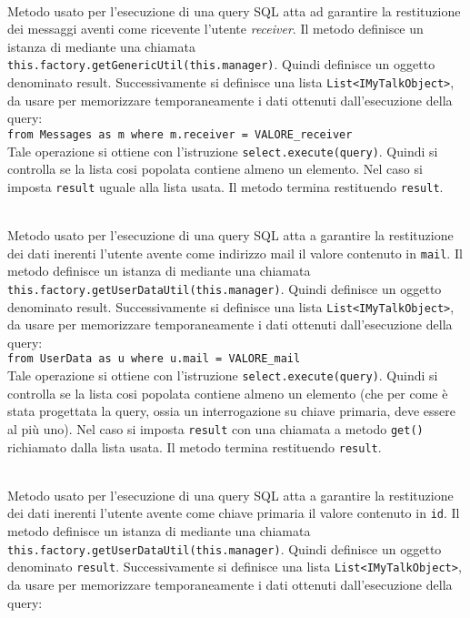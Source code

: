 \begin{description}
		\item{}\\
	Metodo usato per l'esecuzione di una query SQL atta ad garantire la restituzione dei messaggi aventi come ricevente l'utente \textit{receiver}. Il metodo definisce un istanza di  mediante una chiamata \verb|this.factory.getGenericUtil(this.manager)|. Quindi definisce un oggetto  denominato result. Successivamente si definisce una lista \texttt{List<IMyTalkObject>}, da usare per memorizzare temporaneamente i dati ottenuti dall'esecuzione della query:\\
	
	\verb|from Messages as m where m.receiver = VALORE_receiver|\\
	
	Tale operazione si ottiene con l'istruzione \verb|select.execute(query)|. Quindi si controlla se la lista cosi popolata contiene almeno un elemento. Nel caso si imposta \texttt{result} uguale alla lista usata. Il metodo termina restituendo \texttt{result}.	
	
	\item{}\\
	Metodo usato per l'esecuzione di una query SQL atta a garantire la restituzione dei dati inerenti l'utente avente come indirizzo mail il valore contenuto in \texttt{mail}. Il metodo definisce un istanza di  mediante una chiamata \verb|this.factory.getUserDataUtil(this.manager)|. Quindi definisce un oggetto  denominato result. Successivamente si definisce una lista \texttt{List<IMyTalkObject>}, da usare per memorizzare temporaneamente i dati ottenuti dall'esecuzione della query:\\
	
	\verb|from UserData as u where u.mail = VALORE_mail|\\
	
	Tale operazione si ottiene con l'istruzione \verb|select.execute(query)|. Quindi si controlla se la lista cosi popolata contiene almeno un elemento (che per come è stata progettata la query, ossia un interrogazione su chiave primaria, deve essere al più uno). Nel caso si imposta \texttt{result} con una chiamata a metodo \texttt{get()} richiamato dalla lista usata. Il metodo termina restituendo \texttt{result}.	
	
	\item{}\\
	Metodo usato per l'esecuzione di una query SQL atta a garantire la restituzione dei dati inerenti l'utente avente come chiave primaria il valore contenuto in \texttt{id}. Il metodo definisce un istanza di  mediante una chiamata \verb|this.factory.getUserDataUtil(this.manager)|. Quindi definisce un oggetto  denominato \texttt{result}. Successivamente si definisce una lista \texttt{List<IMyTalkObject>}, da usare per memorizzare temporaneamente i dati ottenuti dall'esecuzione della query:\\
	

\end{description}
